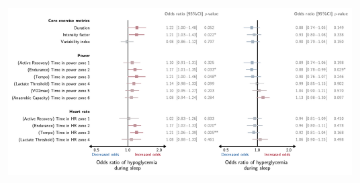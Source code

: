 \documentclass[11pt,a4paper]{article}
\begin{document}
\begin{figure}
\begin{subfigure}{\textwidth}
    \end{subfigure}
    \begin{subfigure}{\textwidth}
        \centering
        \caption{}
        \label{fig:reg-train-sleep}
        \includegraphics[trim=0cm 0cm 0cm 8mm, clip, width=.95\textwidth]{figure/train/coef_binomial_sleep.pdf}
    \end{subfigure}
\end{figure}
\end{document}
